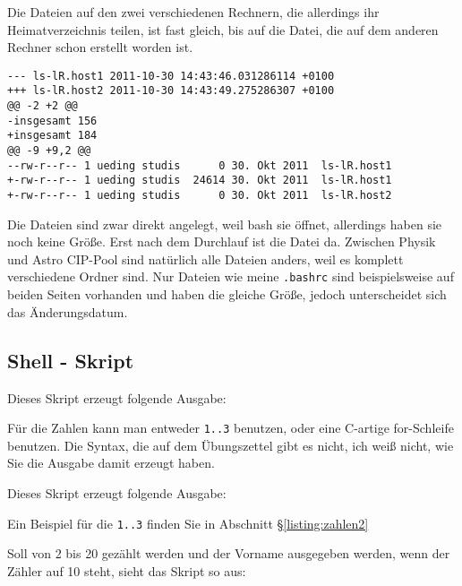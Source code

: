 \documentclass[10pt]{article}
\begin{document}
Die Dateien auf den zwei verschiedenen Rechnern, die allerdings ihr Heimatverzeichnis teilen, ist fast gleich, bis auf die Datei, die auf dem anderen Rechner schon erstellt worden ist.

\begin{lstlisting}
--- ls-lR.host1 2011-10-30 14:43:46.031286114 +0100
+++ ls-lR.host2 2011-10-30 14:43:49.275286307 +0100
@@ -2 +2 @@
-insgesamt 156
+insgesamt 184
@@ -9 +9,2 @@
--rw-r--r-- 1 ueding studis      0 30. Okt 2011  ls-lR.host1
+-rw-r--r-- 1 ueding studis  24614 30. Okt 2011  ls-lR.host1
+-rw-r--r-- 1 ueding studis      0 30. Okt 2011  ls-lR.host2
\end{lstlisting}

Die Dateien sind zwar direkt angelegt, weil bash sie öffnet, allerdings haben sie noch keine Größe. Erst nach dem Durchlauf ist die Datei da. Zwischen Physik und Astro CIP-Pool sind natürlich alle Dateien anders, weil es komplett verschiedene Ordner sind. Nur Dateien wie meine \texttt{.bashrc} sind beispielsweise auf beiden Seiten vorhanden und haben die gleiche Größe, jedoch unterscheidet sich das Änderungsdatum.


\subsection{Shell - Skript}

\lstset{language=bash}


Dieses Skript erzeugt folgende Ausgabe:



Für die Zahlen kann man entweder \texttt{{1..3}} benutzen, oder eine C-artige for-Schleife benutzen. Die Syntax, die auf dem Übungszettel gibt es nicht, ich weiß nicht, wie Sie die Ausgabe damit erzeugt haben.

\lstset{language=bash}


Dieses Skript erzeugt folgende Ausgabe:



Ein Beispiel für die \texttt{{1..3}} finden Sie in Abschnitt §\ref{listing:zahlen2}

Soll von 2 bis 20 gezählt werden und der Vorname ausgegeben werden, wenn der Zähler auf 10 steht, sieht das Skript so aus:


\lstset{language=bash}

\end{document}
